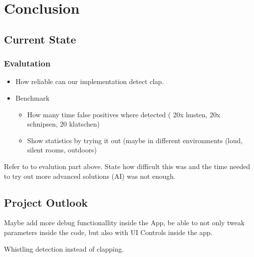 \chapter{Conclusion}
\label{sec:org9a10a6c}
\section{Current State}
\label{sec:org4afd87a}
\subsection{Evalutation}
\label{sec:org350e527}
\begin{itemize}
\item How reliable can our implementation detect clap.
\item Benchmark
\begin{itemize}
\item How many time false positives where detected ( 20x husten, 20x schnipsen, 20 klatschen)
\item Show statistics by trying it out (maybe in different environments (loud,
silent rooms, outdoors)
\end{itemize}
\end{itemize}

Refer to to evalution part above. State how difficult this was and the time
needed to try out more advanced solutions (AI) was not enough.

\section{Project Outlook}
\label{sec:orgfa9fd4b}
Maybe add more debug functionallity inside the App, be able to not only tweak
parameters inside the code, but also with UI Controls inside the app.

Whistling detection instead of clapping.
